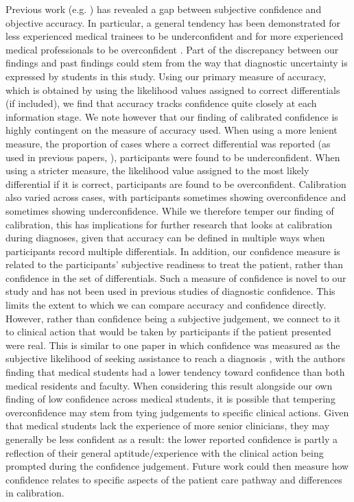 \documentclass[a4paper, nobind]{templates/ociamthesis}
\begin{document}
Previous work (e.g. \textcite{meyer_physicians_2013}) has revealed a gap between subjective confidence and objective accuracy. In particular, a general tendency has been demonstrated for less experienced medical trainees to be underconfident and for more experienced medical professionals to be overconfident \autocite{yang_nurses_2010}. Part of the discrepancy between our findings and past findings could stem from the way that diagnostic uncertainty is expressed by students in this study. Using our primary measure of accuracy, which is obtained by using the likelihood values assigned to correct differentials (if included), we find that accuracy tracks confidence quite closely at each information stage. We note however that our finding of calibrated confidence is highly contingent on the measure of accuracy used. When using a more lenient measure, the proportion of cases where a correct differential was reported (as used in previous papers, \autocite{friedman_physicians_2005,meyer_physicians_2013,lambe_guided_2018,kuper_mitigating_2024}), participants were found to be underconfident. When using a stricter measure, the likelihood value assigned to the most likely differential if it is correct, participants are found to be overconfident. Calibration also varied across cases, with participants sometimes showing overconfidence and sometimes showing underconfidence. While we therefore temper our finding of calibration, this has implications for further research that looks at calibration during diagnoses, given that accuracy can be defined in multiple ways when participants record multiple differentials. In addition, our confidence measure is related to the participants' subjective readiness to treat the patient, rather than confidence in the set of differentials. Such a measure of confidence is novel to our study and has not been used in previous studies of diagnostic confidence. This limits the extent to which we can compare accuracy and confidence directly. However, rather than confidence being a subjective judgement, we connect to it to clinical action that would be taken by participants if the patient presented were real. This is similar to one paper in which confidence was measured as the subjective likelihood of seeking assistance to reach a diagnosis \autocite{friedman_physicians_2005}, with the authors finding that medical students had a lower tendency toward confidence than both medical residents and faculty. When considering this result alongside our own finding of low confidence across medical students, it is possible that tempering overconfidence may stem from tying judgements to specific clinical actions. Given that medical students lack the experience of more senior clinicians, they may generally be less confident as a result: the lower reported confidence is partly a reflection of their general aptitude/experience with the clinical action being prompted during the confidence judgement. Future work could then measure how confidence relates to specific aspects of the patient care pathway and differences in calibration.\\
\end{document}

